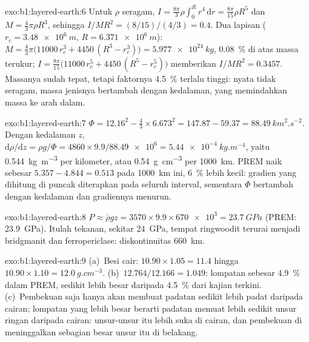 \begin{solution}{exo:b1:layered-earth:6}
Untuk $\rho$ seragam, $I = \tfrac{8\pi}{3}\rho\int_0^R r^4\,\mathrm dr =
\tfrac{8\pi}{15}\rho R^5$ dan $M = \tfrac43\pi\rho R^3$, sehingga
$I/MR^2 = (8/15)/(4/3) = 0.4$. Dua lapisan ($r_c = \qty{3.48e6}{m}$,
$R = \qty{6.371e6}{m}$): $M = \tfrac43\pi\bigl(11000\,r_c^3 + 4450\,(R^3 -
r_c^3)\bigr) = \qty{5.977e24}{kg}$, \qty{0.08}{\percent} di atas massa terukur;
$I = \tfrac{8\pi}{15}\bigl(11000\,r_c^5 + 4450\,(R^5 - r_c^5)\bigr)$ memberikan
$I/MR^2 = 0.3457$. Massanya sudah tepat, tetapi faktornya \qty{4.5}{\percent}
terlalu tinggi:  nyata tidak seragam, massa jenisnya bertambah dengan kedalaman, yang memindahkan massa ke arah dalam.
\end{solution}

\begin{solution}{exo:b1:layered-earth:7}
$\Phi = 12.16^2 - \tfrac43\times6.673^2 = 147.87 - 59.37 =
\qty{88.49}{km^2.s^{-2}}$. Dengan kedalaman $z$,
$\mathrm d\rho/\mathrm dz = \rho g/\Phi = 4860\times9.9/\num{88.49e6} =
\qty{5.44e-4}{kg.m^{-4}}$, yaitu \qty{0.544}{kg.m^{-3}} per kilometer, atau
\qty{0.54}{g.cm^{-3}} per \qty{1000}{km}. PREM naik sebesar $5.357 - 4.844 =
0.513$ pada \qty{1000}{km} ini, \qty{6}{\percent} lebih kecil: gradien yang dihitung di puncak diterapkan pada seluruh interval, sementara $\Phi$ bertambah dengan kedalaman dan gradiennya menurun.
\end{solution}

\begin{solution}{exo:b1:layered-earth:8}
$P \approx \bar\rho g z = 3570\times9.9\times\num{670e3} = \qty{23.7}{GPa}$
(PREM: \qty{23.9}{GPa}). Itulah tekanan, sekitar \qty{24}{GPa}, tempat
ringwoodit terurai menjadi bridgmanit dan ferropericlase: diskontinuitas
\qty{660}{km}.
\end{solution}

\begin{solution}{exo:b1:layered-earth:9}
(a)~Besi cair: $10.90\times1.05 = 11.4$ hingga $10.90\times1.10 =
\qty{12.0}{g.cm^{-3}}$. (b)~$12.764/12.166 = 1.049$: lompatan
sebesar \qty{4.9}{\percent} dalam PREM, sedikit lebih besar daripada \qty{4.5}{\percent} dari
kajian terkini. (c)~Pembekuan saja hanya akan membuat padatan sedikit lebih padat
daripada cairan; lompatan yang lebih besar berarti padatan memuat lebih sedikit
unsur ringan daripada cairan: unsur-unsur itu lebih suka di cairan, dan pembekuan di
 meninggalkan sebagian besar unsur itu di belakang.
\end{solution}

